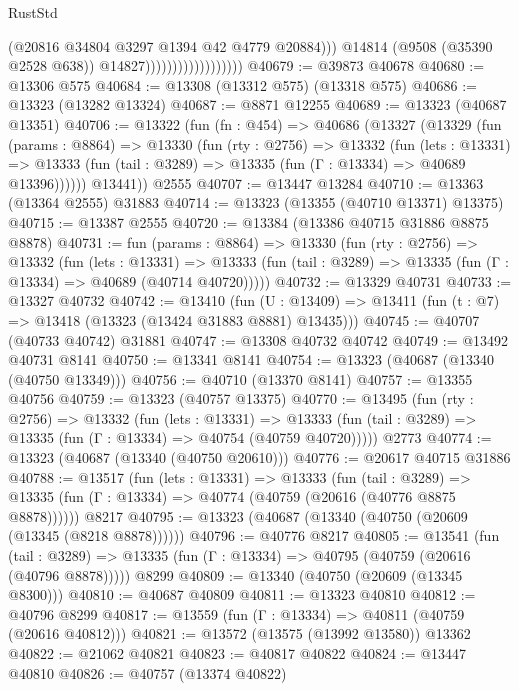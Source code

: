 \begin{lexlean}{RustStd}
\begin{coremodule}
                                            (@20816 @34804 @3297 @1394 @42 @4779 @20884)))
                                        @14814
                                        (@9508 (@35390 @2528 @638))
                                        @14827))))))))))))))))))
@40679 := @39873 @40678
@40680 := @13306 @575
@40684 := @13308 (@13312 @575) (@13318 @575)
@40686 := @13323 (@13282 @13324)
@40687 := @8871 @12255
@40689 := @13323 (@40687 @13351)
@40706 := @13322
    (fun (fn : @454) =>
    @40686
      (@13327
        (@13329
          (fun (params : @8864) =>
          @13330
            (fun (rty : @2756) =>
            @13332
              (fun (lets : @13331) =>
              @13333 (fun (tail : @3289) => @13335 (fun (Γ : @13334) => @40689 @13396))))))
        @13441))
    @2555
@40707 := @13447 @13284
@40710 := @13363 (@13364 @2555) @31883
@40714 := @13323 (@13355 (@40710 @13371) @13375)
@40715 := @13387 @2555
@40720 := @13384 (@13386 @40715 @31886 @8875 @8878)
@40731 := fun (params : @8864) =>
  @13330
    (fun (rty : @2756) =>
    @13332
      (fun (lets : @13331) =>
      @13333 (fun (tail : @3289) => @13335 (fun (Γ : @13334) => @40689 (@40714 @40720)))))
@40732 := @13329 @40731
@40733 := @13327 @40732
@40742 := @13410
    (fun (U : @13409) => @13411 (fun (t : @7) => @13418 (@13323 (@13424 @31883 @8881) @13435)))
@40745 := @40707 (@40733 @40742) @31881
@40747 := @13308 @40732 @40742
@40749 := @13492 @40731 @8141
@40750 := @13341 @8141
@40754 := @13323 (@40687 (@13340 (@40750 @13349)))
@40756 := @40710 (@13370 @8141)
@40757 := @13355 @40756
@40759 := @13323 (@40757 @13375)
@40770 := @13495
    (fun (rty : @2756) =>
    @13332
      (fun (lets : @13331) =>
      @13333 (fun (tail : @3289) => @13335 (fun (Γ : @13334) => @40754 (@40759 @40720)))))
    @2773
@40774 := @13323 (@40687 (@13340 (@40750 @20610)))
@40776 := @20617 @40715 @31886
@40788 := @13517
    (fun (lets : @13331) =>
    @13333
      (fun (tail : @3289) =>
      @13335 (fun (Γ : @13334) => @40774 (@40759 (@20616 (@40776 @8875 @8878))))))
    @8217
@40795 := @13323 (@40687 (@13340 (@40750 (@20609 (@13345 (@8218 @8878))))))
@40796 := @40776 @8217
@40805 := @13541
    (fun (tail : @3289) => @13335 (fun (Γ : @13334) => @40795 (@40759 (@20616 (@40796 @8878)))))
    @8299
@40809 := @13340 (@40750 (@20609 (@13345 @8300)))
@40810 := @40687 @40809
@40811 := @13323 @40810
@40812 := @40796 @8299
@40817 := @13559 (fun (Γ : @13334) => @40811 (@40759 (@20616 @40812)))
@40821 := @13572 (@13575 (@13992 @13580)) @13362
@40822 := @21062 @40821
@40823 := @40817 @40822
@40824 := @13447 @40810
@40826 := @40757 (@13374 @40822)

\end{coremodule}
\end{lexlean}
